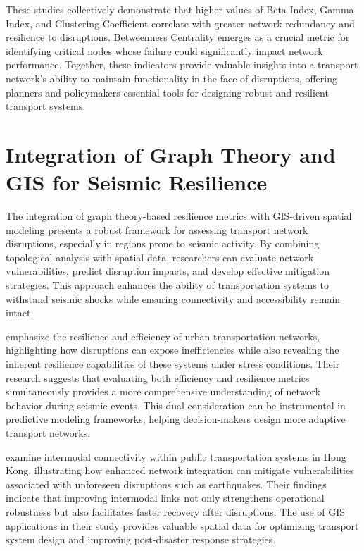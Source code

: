 These studies collectively demonstrate that higher values of Beta Index, Gamma Index, and Clustering Coefficient correlate with greater network redundancy and resilience to disruptions. Betweenness Centrality emerges as a crucial metric for identifying critical nodes whose failure could significantly impact network performance. Together, these indicators provide valuable insights into a transport network's ability to maintain functionality in the face of disruptions, offering planners and policymakers essential tools for designing robust and resilient transport systems.
\section{Integration of Graph Theory and GIS for Seismic Resilience}

The integration of graph theory-based resilience metrics with GIS-driven spatial modeling presents a robust framework for assessing transport network disruptions, especially in regions prone to seismic activity. By combining topological analysis with spatial data, researchers can evaluate network vulnerabilities, predict disruption impacts, and develop effective mitigation strategies. This approach enhances the ability of transportation systems to withstand seismic shocks while ensuring connectivity and accessibility remain intact.

\cite{ganin2017} emphasize the resilience and efficiency of urban transportation networks, highlighting how disruptions can expose inefficiencies while also revealing the inherent resilience capabilities of these systems under stress conditions. Their research suggests that evaluating both efficiency and resilience metrics simultaneously provides a more comprehensive understanding of network behavior during seismic events. This dual consideration can be instrumental in predictive modeling frameworks, helping decision-makers design more adaptive transport networks.

\cite{xu2023} examine intermodal connectivity within public transportation systems in Hong Kong, illustrating how enhanced network integration can mitigate vulnerabilities associated with unforeseen disruptions such as earthquakes. Their findings indicate that improving intermodal links not only strengthens operational robustness but also facilitates faster recovery after disruptions. The use of GIS applications in their study provides valuable spatial data for optimizing transport system design and improving post-disaster response strategies.

